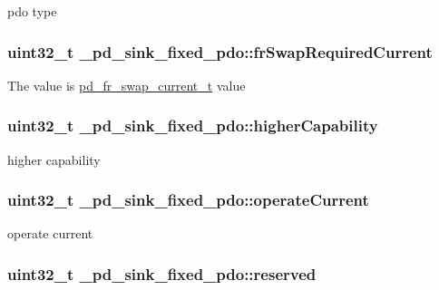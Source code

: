 pdo type \hypertarget{struct__pd__sink__fixed__pdo_a31798efee281f6d1c69ff96d7a79e113}{
\subsubsection[{fr\-Swap\-Required\-Current}]{\setlength{\rightskip}{0pt plus 5cm}uint32\-\_\-t \-\_\-pd\-\_\-sink\-\_\-fixed\-\_\-pdo\-::fr\-Swap\-Required\-Current}}\label{struct__pd__sink__fixed__pdo_a31798efee281f6d1c69ff96d7a79e113}
The value is \hyperlink{group__usb__pd__stack_gaed8d775bac19feb90ff7a857e9768366}{pd\-\_\-fr\-\_\-swap\-\_\-current\-\_\-t} value \hypertarget{struct__pd__sink__fixed__pdo_a511903e5dca26d874a304e558db6cc72}{
\subsubsection[{higher\-Capability}]{\setlength{\rightskip}{0pt plus 5cm}uint32\-\_\-t \-\_\-pd\-\_\-sink\-\_\-fixed\-\_\-pdo\-::higher\-Capability}}\label{struct__pd__sink__fixed__pdo_a511903e5dca26d874a304e558db6cc72}
higher capability \hypertarget{struct__pd__sink__fixed__pdo_a264499e662c6bb82e0e25fc3d296b88b}{
\subsubsection[{operate\-Current}]{\setlength{\rightskip}{0pt plus 5cm}uint32\-\_\-t \-\_\-pd\-\_\-sink\-\_\-fixed\-\_\-pdo\-::operate\-Current}}\label{struct__pd__sink__fixed__pdo_a264499e662c6bb82e0e25fc3d296b88b}
operate current \hypertarget{struct__pd__sink__fixed__pdo_a209b36f044c02c50495b3b688be779cf}{
\subsubsection[{reserved}]{\setlength{\rightskip}{0pt plus 5cm}uint32\-\_\-t \-\_\-pd\-\_\-sink\-\_\-fixed\-\_\-pdo\-::reserved}}\label{struct__pd__sink__fixed__pdo_a209b36f044c02c50495b3b688be779cf}
